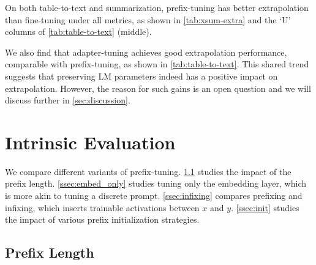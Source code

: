 \documentclass[11pt,a4paper]{article}
\newcommand\pl[1]{\textcolor{red}{[PL: #1]}}
\newcommand\lisa[1]{\textcolor{blue}{[Lisa: #1]}}
\begin{document}
On both table-to-text and summarization, prefix-tuning has better extrapolation than fine-tuning under all metrics, as shown in \cref{tab:xsum-extra} and the `U' columns of \cref{tab:table-to-text} (middle). 

We also find that adapter-tuning achieves good extrapolation performance, comparable with prefix-tuning, as shown in \cref{tab:table-to-text}. This shared trend suggests that preserving LM parameters indeed has a positive impact on extrapolation. However, the reason for such gains is an open question and we will discuss further in \cref{sec:discussion}. 

\section{Intrinsic Evaluation}
\label{sec:intrinsic}
We compare different variants of prefix-tuning. 
\cref{ssec:prefix_length} studies the impact of the prefix length.
\cref{ssec:embed_only} studies tuning only the embedding layer, which is more akin to tuning a discrete prompt. 
\cref{ssec:infixing} compares prefixing and infixing, which inserts trainable activations between $x$ and $y$.  
\cref{ssec:init} studies the impact of various prefix initialization strategies.

\subsection{Prefix Length}
\label{ssec:prefix_length}
\end{document}
